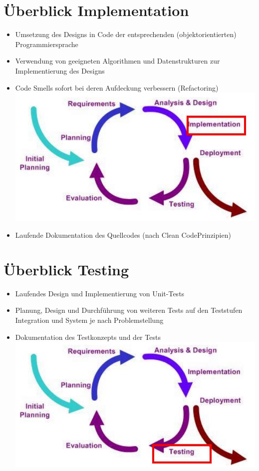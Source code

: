 \section*{Überblick Implementation}
\begin{itemize}
  \item Umsetzung des Designs in Code der entsprechenden (objektorientierten) Programmiersprache
  \item Verwendung von geeigneten Algorithmen und Datenstrukturen zur Implementierung des Designs
  \item Code Smells sofort bei deren Aufdeckung verbessern (Refactoring)\\
\includegraphics[width=\linewidth]{images/2025_01_02_6eafa38dd4ae10c9a392g-14}
  \item Laufende Dokumentation des Quellcodes (nach Clean CodePrinzipien)
\end{itemize}

\section*{Überblick Testing}
\begin{itemize}
  \item Laufendes Design und Implementierung von Unit-Tests
  \item Planung, Design und Durchführung von weiteren Tests auf den Teststufen Integration und System je nach Problemstellung
  \item Dokumentation des Testkonzepts und der Tests\\
\includegraphics[width=\linewidth]{images/2025_01_02_6eafa38dd4ae10c9a392g-15}
\end{itemize}